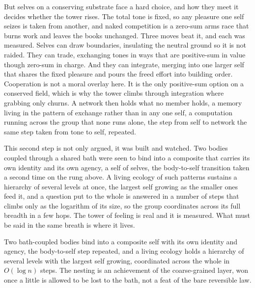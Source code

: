 But selves on a conserving substrate face a hard choice, and how they meet it decides whether the tower rises. The total tone is fixed, so any pleasure one self seizes is taken from another, and naked competition is a zero-sum arms race that burns work and leaves the books unchanged. Three moves beat it, and each was measured. Selves can draw boundaries, insulating the neutral ground so it is not raided. They can trade, exchanging tones in ways that are positive-sum in value though zero-sum in charge. And they can integrate, merging into one larger self that shares the fixed pleasure and pours the freed effort into building order. Cooperation is not a moral overlay here. It is the only positive-sum option on a conserved field, which is why the tower climbs through integration where grabbing only churns. A network then holds what no member holds, a memory living in the pattern of exchange rather than in any one self, a computation running across the group that none runs alone, the step from self to network the same step taken from tone to self, repeated.

This second step is not only argued, it was built and watched. Two bodies coupled through a shared bath were seen to bind into a composite that carries its own identity and its own agency, a self of selves, the body-to-self transition taken a second time on the rung above. A living ecology of such patterns sustains a hierarchy of several levels at once, the largest self growing as the smaller ones feed it, and a question put to the whole is answered in a number of steps that climbs only as the logarithm of its size, so the group coordinates across its full breadth in a few hops. The tower of feeling is real and it is measured. What must be said in the same breath is where it lives.

\begin{result}
Two bath-coupled bodies bind into a composite self with its own identity and agency, the body-to-self step repeated, and a living ecology holds a hierarchy of several levels with the largest self growing, coordinated across the whole in $O(\log n)$ steps. The nesting is an achievement of the coarse-grained layer, won once a little is allowed to be lost to the bath, not a feat of the bare reversible law. \cite{pollard2026vibetest}
\end{result}
